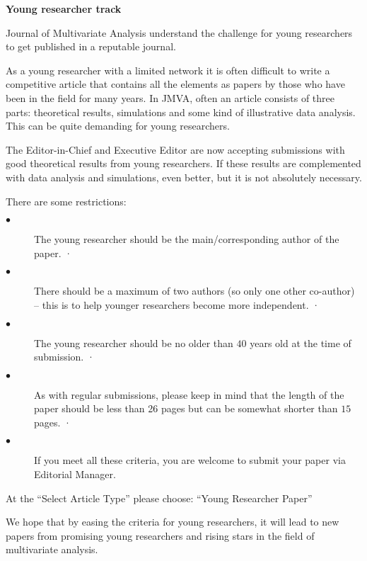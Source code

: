 \documentclass[times,sort&compress,3p]{elsarticle}
\theoremstyle{plain}%
\theoremstyle{definition}
\begin{document}
\newpage
\centerline{\Large{\textbf{Young researcher track}}}
\smallskip
Journal of Multivariate Analysis understand the challenge for young researchers to get published in a reputable journal.

As a young researcher with a limited network it is often difficult to write a competitive article that contains all the elements as papers by those who have been in the field for many years. In JMVA, often an article consists of three parts: theoretical results, simulations and some kind of illustrative data analysis. This can be quite demanding for young researchers.

The Editor-in-Chief and Executive Editor are now accepting submissions with good theoretical results from young researchers. If these results are complemented with data analysis and simulations, even better, but it is not absolutely necessary.


There are some restrictions:
\begin{description}
\item[$\bullet$] The young researcher should be the main/corresponding author of the paper.
·\item[$\bullet$]  There should be a maximum of two authors (so only one other co-author) – this is to help younger researchers become more independent.
·\item[$\bullet$]  The young researcher should be no older than $40$ years old at the time of submission.
·\item[$\bullet$]  As with regular submissions, please keep in mind that the length of the paper should be less than 26 pages but can be somewhat shorter than $15$ pages.
·\item[$\bullet$] If you meet all these criteria, you are welcome to submit your paper via Editorial Manager.
\end{description}
At the “Select Article Type” please choose: “Young Researcher Paper”

We hope that by easing the criteria for young researchers, it will lead to new papers from promising young researchers and rising stars in the field of multivariate analysis.
\end{document}
